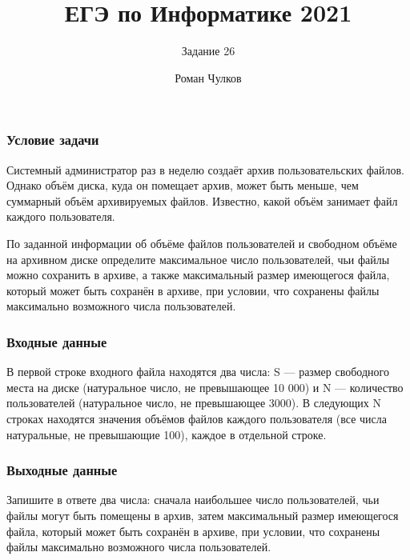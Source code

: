 \documentclass{beamer}
\title[Задание 26]{ЕГЭ по Информатике 2021}
\subtitle{Задание 26}
\author{Роман Чулков}
\institute{СПбГУТ}
\begin{document}
\frame{\titlepage}

\begin{frame}

    \frametitle{Условие задачи}

    Системный администратор раз в неделю создаёт архив пользовательских файлов. Однако объём диска, куда он помещает архив, может быть меньше, чем суммарный объём архивируемых файлов. Известно, какой объём занимает файл каждого пользователя. 

    По заданной информации об объёме файлов пользователей и свободном объёме на архивном диске определите максимальное число пользователей, чьи файлы можно сохранить в архиве, а также максимальный размер имеющегося файла, который может быть сохранён в архиве, при условии, что сохранены файлы максимально возможного числа пользователей. 

\end{frame}

\begin{frame}

    \frametitle{Входные данные}

    В первой строке входного файла находятся два числа: S — размер свободного места на диске (натуральное число, не превышающее 10 000) и N — количество пользователей (натуральное число, не превышающее 3000). В следующих N строках находятся значения объёмов файлов каждого пользователя (все числа натуральные, не превышающие 100), каждое в отдельной строке.

\end{frame}

\begin{frame}

    \frametitle{Выходные данные}

    Запишите в ответе два числа: сначала наибольшее число пользователей, чьи файлы могут быть помещены в архив, затем максимальный размер имеющегося файла, который может быть сохранён в архиве, при условии, что сохранены файлы максимально возможного числа пользователей.
    
\end{frame}
\end{document}
